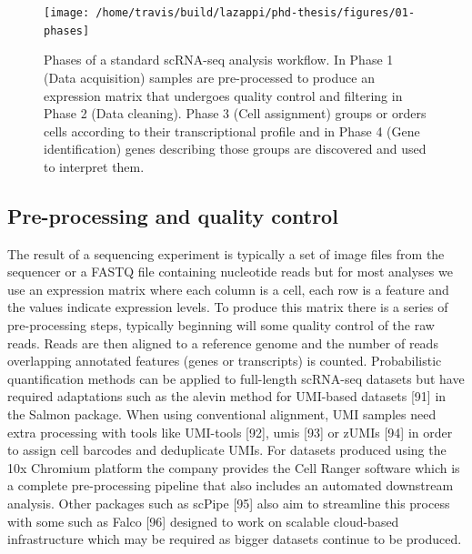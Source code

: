\documentclass[11pt,a4paper,titlepage,twoside,openright]{style/unimelbthesis}
\theoremstyle{definition}
\theoremstyle{definition}
\theoremstyle{definition}
\theoremstyle{remark}
\begin{document}
\begin{mainmatter}
\begin{figure}

{\centering \texttt{[image: /home/travis/build/lazappi/phd-thesis/figures/01-phases]} 

}

\caption[Phases of a standard scRNA-seq analysis workflow.]{Phases of a standard scRNA-seq analysis workflow. In Phase 1 (Data acquisition) samples are pre-processed to produce an expression matrix that undergoes quality control and filtering in Phase 2 (Data cleaning). Phase 3 (Cell assignment) groups or orders cells according to their transcriptional profile and in Phase 4 (Gene identification) genes describing those groups are discovered and used to interpret them.}\label{fig:phases}
\end{figure}





\hypertarget{pre-processing-and-quality-control}{%
\subsection{Pre-processing and quality control}\label{pre-processing-and-quality-control}}

The result of a sequencing experiment is typically a set of image files from the sequencer or a FASTQ file containing nucleotide reads but for most analyses we use an expression matrix where each column is a cell, each row is a feature and the values indicate expression levels. To produce this matrix there is a series of pre-processing steps, typically beginning will some quality control of the raw reads. Reads are then aligned to a reference genome and the number of reads overlapping annotated features (genes or transcripts) is counted. Probabilistic quantification methods can be applied to full-length scRNA-seq datasets but have required adaptations such as the alevin method for UMI-based datasets {[}91{]} in the Salmon package. When using conventional alignment, UMI samples need extra processing with tools like UMI-tools {[}92{]}, umis {[}93{]} or zUMIs {[}94{]} in order to assign cell barcodes and deduplicate UMIs. For datasets produced using the 10x Chromium platform the company provides the Cell Ranger software which is a complete pre-processing pipeline that also includes an automated downstream analysis. Other packages such as scPipe {[}95{]} also aim to streamline this process with some such as Falco {[}96{]} designed to work on scalable cloud-based infrastructure which may be required as bigger datasets continue to be produced.


\end{mainmatter}
\end{document}

